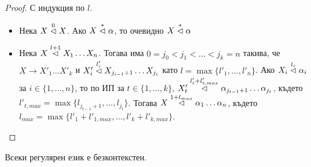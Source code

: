 \begin{proof}
    С индукция по $l$.

    \begin{itemize}
        \item Нека $X \stackrel{0}{\vartriangleleft} X$. Ако $X \stackrel{*}{\vartriangleleft} \alpha$, то очевидно $X \stackrel{*}{\vartriangleleft} \alpha$ \checkmark
        \item Нека $X \stackrel{l + 1}{\vartriangleleft} X_1 \dots X_n$. Тогава има $0 = j_0 < j_1 < \dots < j_k = n$ такива, че $X \rightarrow X'_1 \dots X'_k$ и $X'_i \stackrel{l'_i}{\vartriangleleft} X_{j_{i - 1} + 1} \dots X_{j_i}$ като $l = \max \{ l'_1, \dots, l'_n \}$.
              Ако $X_i \stackrel{l_i}{\vartriangleleft} \alpha_i$ за $i \in \{ 1, \dots, n \}$, то по ИП за $t \in \{ 1, \dots, k \}$, $X'_t \stackrel{l'_t + l'_{t, max}}{\vartriangleleft} \alpha_{j_{t - 1} + 1} \dots \alpha_{j_t}$, където $l'_{t, max} = \max \{ l_{j_{t - 1} + 1}, \dots, l_{j_t} \}$.
              Тогава $X \stackrel{1 + l_{max}}{\vartriangleleft} \alpha_1 \dots \alpha_n$, където $l_{max} = \max \{ l'_1 + l'_{1, max}, \dots, l'_k + l'_{k, max} \}$.
    \end{itemize}
\end{proof}

\begin{claim}
    Всеки регулярен език е безконтекстен.
\end{claim}

